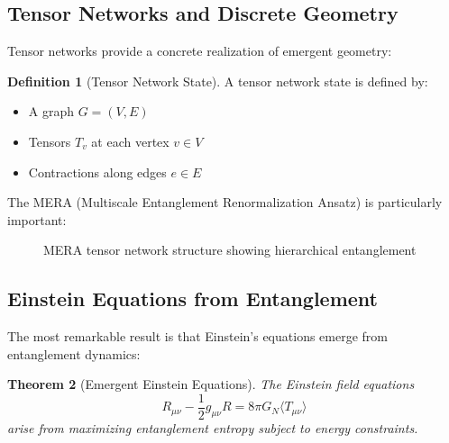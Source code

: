 \documentclass[12pt,a4paper]{article}
\theoremstyle{plain}
\newtheorem{theorem}{Theorem}[section]
\theoremstyle{definition}
\newtheorem{definition}[theorem]{Definition}
\theoremstyle{remark}
\begin{document}
\subsection{Tensor Networks and Discrete Geometry}

Tensor networks provide a concrete realization of emergent geometry:

\begin{definition}[Tensor Network State]
A tensor network state is defined by:
\begin{itemize}
\item A graph $G = (V,E)$
\item Tensors $T_v$ at each vertex $v \in V$
\item Contractions along edges $e \in E$
\end{itemize}
\end{definition}

The MERA (Multiscale Entanglement Renormalization Ansatz) is particularly important:

\begin{figure}[H]
\begin{center}
\end{center}
\caption{MERA tensor network structure showing hierarchical entanglement}
\end{figure}

\subsection{Einstein Equations from Entanglement}

The most remarkable result is that Einstein's equations emerge from entanglement dynamics:

\begin{theorem}[Emergent Einstein Equations]
The Einstein field equations
\[R_{\mu\nu} - \frac{1}{2}g_{\mu\nu}R = 8\pi G_N \langle T_{\mu\nu} \rangle\]
arise from maximizing entanglement entropy subject to energy constraints.
\end{theorem}
\end{document}
